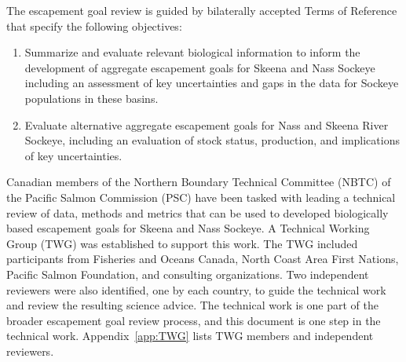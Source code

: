 \documentclass[french,11pt]{book}
\begin{document}
The escapement goal review is guided by bilaterally accepted Terms of Reference that specify the following objectives:
\begin{enumerate}
\def\labelenumi{\arabic{enumi}.}

\item
  Summarize and evaluate relevant biological information to inform the development of aggregate escapement goals for Skeena and Nass Sockeye including an assessment of key uncertainties and gaps in the data for Sockeye populations in these basins.
\item
  Evaluate alternative aggregate escapement goals for Nass and Skeena River Sockeye, including an evaluation of stock status, production, and implications of key uncertainties.
\end{enumerate}
Canadian members of the Northern Boundary Technical Committee (NBTC) of the Pacific Salmon Commission (PSC) have been tasked with leading a technical review of data, methods and metrics that can be used to developed biologically based escapement goals for Skeena and Nass Sockeye. A Technical Working Group (TWG) was established to support this work. The TWG included participants from Fisheries and Oceans Canada, North Coast Area First Nations, Pacific Salmon Foundation, and consulting organizations. Two independent reviewers were also identified, one by each country, to guide the technical work and review the resulting science advice. The technical work is one part of the broader escapement goal review process, and this document is one step in the technical work. Appendix~\ref{app:TWG} lists TWG members and independent reviewers.
\end{document}
